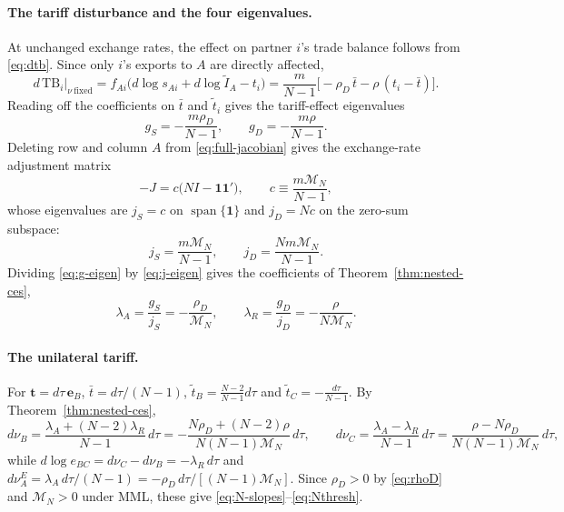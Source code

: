 \documentclass[11pt]{article}
\begin{document}
\paragraph{The tariff disturbance and the four eigenvalues.}
At unchanged exchange rates, the effect on partner $i$'s trade balance follows from \eqref{eq:dtb}. Since only $i$'s exports to $A$ are directly affected,
\begin{equation}
d\,\mathrm{TB}_i\big|_{\nu\ \mathrm{fixed}}
=f_{Ai}\big(d\log s_{Ai}+d\log\widetilde I_A-t_i\big)
=\frac{m}{N-1}\Big[-\rho_D\,\bar t-\rho\,(t_i-\bar t)\Big].
\label{eq:impact-chain}
\end{equation}
Reading off the coefficients on $\bar t$ and $\tilde t_i$ gives the tariff-effect eigenvalues
\begin{equation}
g_S=-\frac{m\rho_D}{N-1}, \qquad
g_D=-\frac{m\rho}{N-1}.
\label{eq:g-eigen}
\end{equation}
Deleting row and column $A$ from \eqref{eq:full-jacobian} gives the exchange-rate adjustment matrix
\begin{equation}
-J=c\big(NI-\mathbf{1}\mathbf{1}'\big), \qquad
c\equiv\frac{m\mathcal M_N}{N-1},
\label{eq:J-matrix}
\end{equation}
whose eigenvalues are $j_S=c$ on $\operatorname{span}\{\mathbf 1\}$ and $j_D=Nc$ on the zero-sum subspace:
\begin{equation}
j_S=\frac{m\mathcal M_N}{N-1}, \qquad
j_D=\frac{Nm\mathcal M_N}{N-1}.
\label{eq:j-eigen}
\end{equation}
Dividing \eqref{eq:g-eigen} by \eqref{eq:j-eigen} gives the coefficients of Theorem~\ref{thm:nested-ces},
\[
\lambda_A=\frac{g_S}{j_S}=-\frac{\rho_D}{\mathcal M_N},
\qquad
\lambda_R=\frac{g_D}{j_D}=-\frac{\rho}{N\mathcal M_N}.
\]

\paragraph{The unilateral tariff.}
For $\mathbf t=d\tau\,\mathbf{e}_B$, $\bar t=d\tau/(N-1)$, $\tilde t_B=\frac{N-2}{N-1}d\tau$ and $\tilde t_C=-\frac{d\tau}{N-1}$. By Theorem~\ref{thm:nested-ces},
\[
d\nu_B=\frac{\lambda_A+(N-2)\lambda_R}{N-1}\,d\tau=-\frac{N\rho_D+(N-2)\rho}{N(N-1)\mathcal M_N}\,d\tau,
\qquad
d\nu_C=\frac{\lambda_A-\lambda_R}{N-1}\,d\tau=\frac{\rho-N\rho_D}{N(N-1)\mathcal M_N}\,d\tau,
\]
while $d\log e_{BC}=d\nu_C-d\nu_B=-\lambda_R\,d\tau$ and $d\nu_A^E=\lambda_A\,d\tau/(N-1)=-\rho_D\,d\tau/[(N-1)\mathcal M_N]$. Since $\rho_D>0$ by \eqref{eq:rhoD} and $\mathcal M_N>0$ under MML, these give \eqref{eq:N-slopes}--\eqref{eq:Nthresh}.
\end{document}
